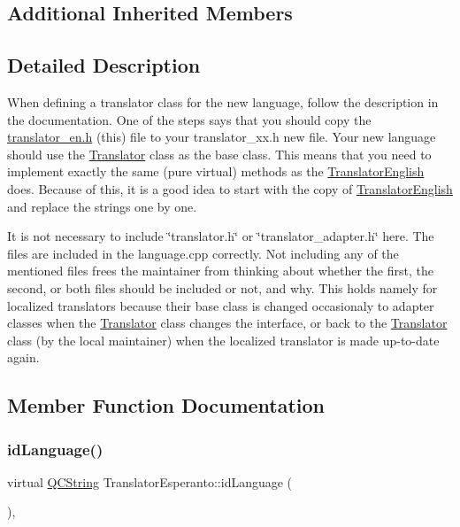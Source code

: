\subsection*{Additional Inherited Members}


\subsection{Detailed Description}
When defining a translator class for the new language, follow the description in the documentation. One of the steps says that you should copy the \mbox{\hyperlink{translator__en_8h_source}{translator\+\_\+en.\+h}} (this) file to your translator\+\_\+xx.\+h new file. Your new language should use the \mbox{\hyperlink{class_translator}{Translator}} class as the base class. This means that you need to implement exactly the same (pure virtual) methods as the \mbox{\hyperlink{class_translator_english}{Translator\+English}} does. Because of this, it is a good idea to start with the copy of \mbox{\hyperlink{class_translator_english}{Translator\+English}} and replace the strings one by one.

It is not necessary to include \char`\"{}translator.\+h\char`\"{} or \char`\"{}translator\+\_\+adapter.\+h\char`\"{} here. The files are included in the language.\+cpp correctly. Not including any of the mentioned files frees the maintainer from thinking about whether the first, the second, or both files should be included or not, and why. This holds namely for localized translators because their base class is changed occasionaly to adapter classes when the \mbox{\hyperlink{class_translator}{Translator}} class changes the interface, or back to the \mbox{\hyperlink{class_translator}{Translator}} class (by the local maintainer) when the localized translator is made up-\/to-\/date again. 

\subsection{Member Function Documentation}
\mbox{\label{class_translator_esperanto_aaf20d4da9ce48d26d7e82cd0464d6e02}} 
\subsubsection{\texorpdfstring{idLanguage()}{idLanguage()}}
{\footnotesize\ttfamily virtual \mbox{\hyperlink{class_q_c_string}{Q\+C\+String}} Translator\+Esperanto\+::id\+Language (\begin{DoxyParamCaption}{ }\end{DoxyParamCaption})\hspace{0.3cm}{\ttfamily [inline]}, {\ttfamily [virtual]}}

